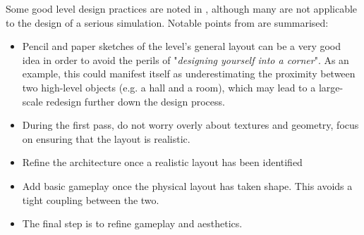 Some good level design practices are noted in \cite{Rouse2004GamePractice}, although many are not applicable to the design of a serious simulation. Notable points from \cite{Rouse2004GamePractice} are summarised:
\begin{itemize}
    \item Pencil and paper sketches of the level's general layout can be a very good idea in order to avoid the perils of "\textit{designing yourself into a corner}". As an example, this could manifest itself as underestimating the proximity between two high-level objects (e.g. a hall and a room), which may lead to a large-scale redesign further down the design process.
    \item During the first pass, do not worry overly about textures and geometry, focus on ensuring that the layout is realistic.
    \item Refine the architecture once a realistic layout has been identified
    \item Add basic gameplay once the physical layout has taken shape. This avoids a tight coupling between the two.
    \item The final step is to refine gameplay and aesthetics.
\end{itemize}

